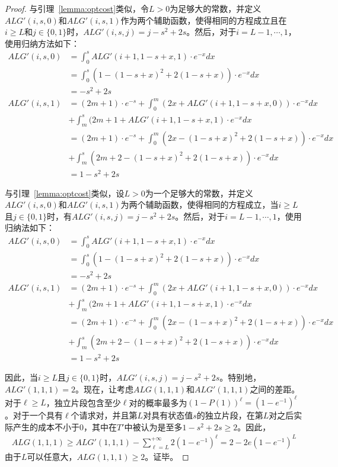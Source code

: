 \begin{proof}
与引理~\ref{lemma:optcost}类似，令$L>0$为足够大的常数，并定义$ALG'(i,s,0)$和$ALG'(i,s,1)$作为两个辅助函数，使得相同的方程成立且在$i\geq L$和$j\in \{0,1\}$时，$ALG'(i,s,j)=j-s^2+2s$。然后，对于$i=L-1,\cdots,1$，使用归纳方法如下：
\begin{align*}
    ALG'(i,s,0)&=\int_{0}^{s}ALG'(i+1,1-s+x,1)\cdot e^{-x}dx \\
    &=\int_{0}^{s}(1-(1-s+x)^2+2(1-s+x))\cdot e^{-x}dx \\
    &=-s^2+2s \\
    ALG'(i,s,1)&=(2m+1)\cdot e^{-s}+\int_{0}^{m}(2x+ALG'(i+1,1-s+x,0))\cdot e^{-x}dx \\
    &+\int_{m}^{s}(2m+1+ALG'(i+1,1-s+x,1)\cdot e^{-x}dx \\
    &=(2m+1)\cdot e^{-s}+\int_{0}^{m}(2x-(1-s+x)^2+2(1-s+x))\cdot e^{-x}dx \\
    &+\int_{m}^{s}(2m+2-(1-s+x)^2+2(1-s+x))\cdot e^{-x}dx \\
    &=1-s^2+2s
\end{align*}

与引理~\ref{lemma:optcost}类似，设$L>0$为一个足够大的常数，并定义$ALG'(i,s,0)$和$ALG'(i,s,1)$为两个辅助函数，使得相同的方程成立，当$i\ge L$且$j\in\{0,1\}$时，有$ALG'(i,s,j)=j-s^2+2s$。然后，对于$i=L-1,\cdots,1$，使用归纳法如下：
\begin{align*}
    ALG'(i,s,0)&=\int_{0}^{s}ALG'(i+1,1-s+x,1)\cdot e^{-x}dx \\
    &=\int_{0}^{s}(1-(1-s+x)^2+2(1-s+x))\cdot e^{-x}dx \\
    &=-s^2+2s \\
    ALG'(i,s,1)&=(2m+1)\cdot e^{-s}+\int_{0}^{m}(2x+ALG'(i+1,1-s+x,0))\cdot e^{-x}dx \\
    &+\int_{m}^{s}(2m+1+ALG'(i+1,1-s+x,1)\cdot e^{-x}dx \\
    &=(2m+1)\cdot e^{-s}+\int_{0}^{m}(2x-(1-s+x)^2+2(1-s+x))\cdot e^{-x}dx \\
    &+\int_{m}^{s}(2m+2-(1-s+x)^2+2(1-s+x))\cdot e^{-x}dx \\
    &=1-s^2+2s
\end{align*}



因此，当$i \geq L$且$j \in \{0,1\}$时，$ALG'(i,s,j)=j-s^2+2s$。特别地，$ALG'(1,1,1)=2$。现在，让考虑$ALG(1,1,1)$和$ALG'(1,1,1)$之间的差距。对于$\ell \geq L$，独立片段包含至少$\ell$对的概率最多为$(1-P(1))^{\ell}=(1-e^{-1})^{\ell}$。对于一个具有$\ell$个请求对，并且第$L$对具有状态值$s$的独立片段，在第$L$对之后实际产生的成本不小于$0$，其中在$T'$中被认为是至多$1-s^2+2s\geq 2$。因此，
\begin{align*}
    ALG(1,1,1)\geq ALG'(1,1,1)-\sum_{\ell=L}^{+\infty}2(1-e^{-1})^{\ell}=2-2e(1-e^{-1})^L
\end{align*}
由于$L$可以任意大，$ALG(1,1,1)\geq 2$。证毕。
\end{proof}


